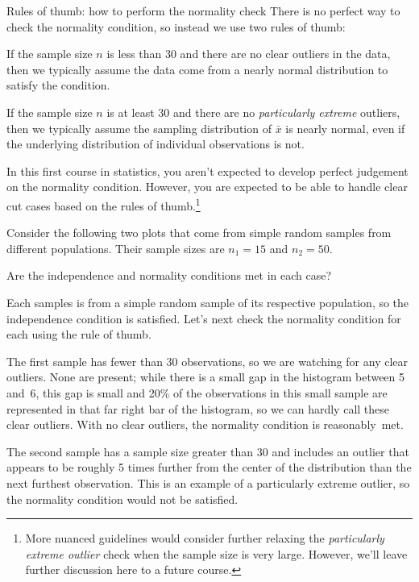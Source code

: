 \begin{onebox}{Rules of thumb:
    how to perform the normality check}
  There is no perfect way to check the normality condition,
  so instead we use two rules of thumb: %
  \begin{description}
  \setlength{\itemsep}{0mm}
  \item[$\mathbf{n < 30}$:]
      If the sample size $n$ is less than 30
      and there are no clear outliers in the data,
      then we typically assume the data come from
      a nearly normal distribution to satisfy the
      condition.
  \item[$\mathbf{n \geq 30}$:]
      If the sample size $n$ is at least 30
      and there are no \emph{particularly extreme} outliers,
      then we typically assume the sampling distribution
      of $\bar{x}$ is nearly normal, even if the underlying
      distribution of individual observations is not.
  \end{description}
\end{onebox}

In this first course in statistics, you aren't expected
to develop perfect judgement on the normality condition.
However, you are expected to be able to handle
clear cut cases based on the rules of thumb.\footnote{More
  nuanced guidelines would consider further relaxing
  the \emph{particularly extreme outlier} check when the
  sample size is very large.
  However, we'll leave further discussion here to a future course.}

\begin{examplewrap}
\begin{nexample}{Consider the following two plots
    that come from simple random samples from
    different populations.
    Their sample sizes are $n_1 = 15$ and $n_2 = 50$.
    \begin{center}
    \end{center}
    Are the independence and normality conditions met
    in each case?}
  \label{outliers_and_ss_condition_ex}%
  Each samples is from a simple random sample of its
  respective population, so the independence condition
  is satisfied.
  Let's next check the normality condition for
  each using the rule of thumb.
  
  The first sample has fewer than 30 observations,
  so we are watching for any clear outliers.
  None are present; while there is a small gap in the
  histogram between 5 and~6, this gap is small and
  20\% of the observations in this small sample
  are represented in that far right bar of the histogram,
  so we can hardly call these clear outliers.
  With no clear outliers, the normality condition
  is reasonably~met.

  The second sample has a sample size greater than 30 and
  includes an outlier that appears to be roughly 5 times
  further from the center of the distribution than the
  next furthest observation.
  This is an example of a particularly extreme outlier,
  so the normality condition would not be satisfied.
\end{nexample}
\end{examplewrap}

